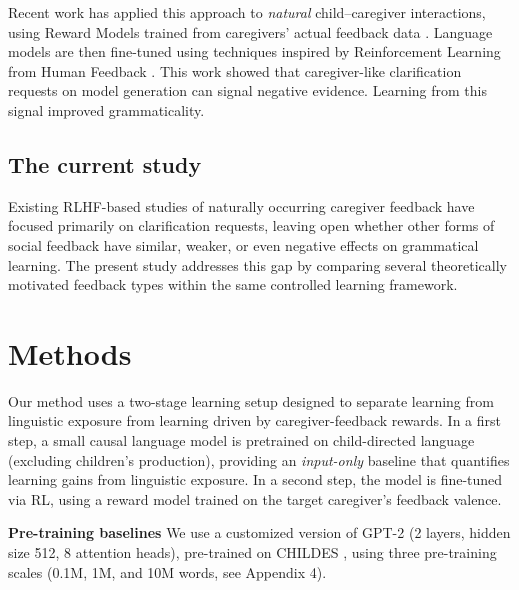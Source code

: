 Recent work has applied this approach to \textit{natural} child--caregiver interactions, using Reward Models trained from caregivers' actual feedback data \cite{nikolaus_fourtassi_2026}. Language models are then fine-tuned using techniques inspired by Reinforcement Learning from Human Feedback \cite[RLHF,][]{ouyang_training_2022}. This work showed that caregiver-like clarification requests on model generation can signal negative evidence. Learning from this signal improved grammaticality.



\subsection*{The current study} 
Existing RLHF-based studies of naturally occurring caregiver feedback have focused primarily on clarification requests, leaving open whether other forms of social feedback have similar, weaker, or even negative effects on grammatical learning. The present study addresses this gap by comparing several theoretically motivated feedback types within the same controlled learning framework.




\section{Methods}  
\label{sec:methods}

Our method uses a two-stage learning setup designed to separate learning from linguistic exposure from learning driven by caregiver-feedback rewards.
In a first step, a small causal language model is pretrained on child-directed language (excluding children's production), providing an \emph{input-only} baseline that quantifies learning gains from linguistic exposure. In a second step, the model is fine-tuned via RL, using a reward model trained on the target caregiver's feedback valence. 


\noindent \textbf{Pre-training baselines}  We use a customized version of GPT-2 (2 layers, hidden size 512, 8 attention heads), pre-trained on CHILDES \citep{macwhinney2000childes}, using three pre-training scales (0.1M, 1M, and 10M words, see Appendix 4).

